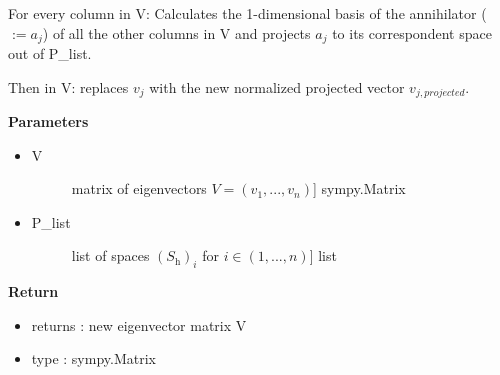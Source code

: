 \documentclass[letterpaper,10pt,english]{sphinxmanual}
\begin{document}
\begin{fulllineitems}
\label{pycontroltools:linearcontrol.robust_poleplacement.exchange_all_cols}
For every column in V:
Calculates the 1-dimensional basis of the annihilator ($:= a_j$)
of all the other columns in V and projects $a_j$ to its
correspondent space out of P\_list.

Then in V: replaces $v_j$ with the new normalized
projected vector $v_{j,projected}$.







\textbf{Parameters}
\begin{itemize}
\item {} \begin{description}
\item[{V}] \leavevmode{[}matrix of eigenvectors $V = (v_1,..., v_n)${]}
sympy.Matrix

\end{description}

\item {} \begin{description}
\item[{P\_list}] \leavevmode{[}list of spaces $(S_{\mathrm{h}})_i$ for $i \in (1,...,n)${]}
list

\end{description}

\end{itemize}

\textbf{Return}
\begin{itemize}
\item {} 
returns : new eigenvector matrix V

\item {} 
type : sympy.Matrix

\end{itemize}

\end{fulllineitems}

\end{document}
